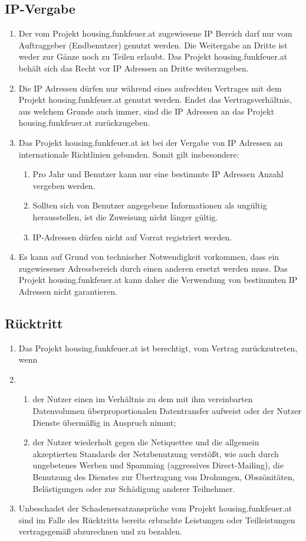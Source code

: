 \documentclass[parskip=half]{article}
\begin{document}
\subsection{IP-Vergabe}
\begin{enumerate}
\item Der vom Projekt housing.funkfeuer.at zugewiesene IP Bereich darf nur vom Auftraggeber
(Endbenutzer) genutzt werden. Die Weitergabe an Dritte ist weder zur Gänze noch zu
Teilen erlaubt. Das Projekt housing.funkfeuer.at behält sich das Recht vor IP Adressen an
Dritte weiterzugeben.
\item Die IP Adressen dürfen nur während eines aufrechten Vertrages mit dem Projekt
housing.funkfeuer.at genutzt werden. Endet das Vertragsverhältnis, aus welchem Grunde
auch immer, sind die IP Adressen an das Projekt housing.funkfeuer.at zurückzugeben.
\newpage
\item Das Projekt housing.funkfeuer.at ist bei der Vergabe von IP Adressen an internationale
Richtlinien gebunden. Somit gilt insbesondere:
\begin{enumerate}
\item Pro Jahr und Benutzer kann nur eine bestimmte IP Adressen Anzahl vergeben werden.
\item Sollten sich von Benutzer angegebene Informationen als ungültig herausstellen, ist die
Zuweisung nicht länger gültig.
\item IP-Adressen dürfen nicht auf Vorrat registriert werden.
\end{enumerate}
\item Es kann auf Grund von technischer Notwendigkeit vorkommen, dass ein zugewiesener
Adressbereich durch einen anderen ersetzt werden muss. Das Projekt housing.funkfeuer.at
kann daher die Verwendung von bestimmten IP Adressen nicht garantieren.
\end{enumerate}

\subsection{Rücktritt}
\begin{enumerate}
\item[] Das Projekt housing.funkfeuer.at ist berechtigt, vom Vertrag zurückzutreten, wenn
\item\begin{enumerate}
\item der Nutzer einen im Verhältnis zu dem mit ihm vereinbarten Datenvolumen
überproportionalen Datentransfer aufweist oder der Nutzer Dienste übermäßig in
Anspruch nimmt;
\item der Nutzer wiederholt gegen die Netiquettee und die allgemein akzeptierten Standards
der Netzbenutzung verstößt, wie auch durch ungebetenes Werben und Spamming
(aggressives Direct-Mailing), die Benutzung des Dienstes zur Übertragung von
Drohungen, Obszönitäten, Belästigungen oder zur Schädigung anderer Teilnehmer.
\end{enumerate}
\item Unbeschadet der Schadenersatzansprüche vom Projekt housing.funkfeuer.at sind im
Falle des Rücktritts bereits erbrachte Leistungen oder Teilleistungen vertragsgemäß
abzurechnen und zu bezahlen.
\end{enumerate}
\end{document}

